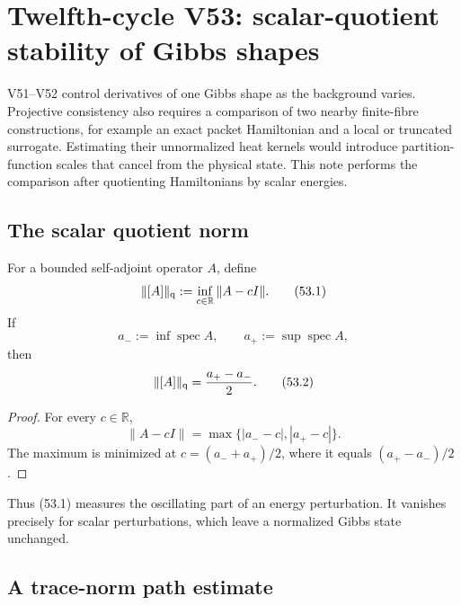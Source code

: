 \documentclass[11pt]{article}
\theoremstyle{remark}
\begin{document}

\section{Twelfth-cycle V53: scalar-quotient stability of Gibbs shapes}
\label{sec:v12v53}

V51--V52 control derivatives of one Gibbs shape as the background
varies.  Projective consistency also requires a comparison of two
nearby finite-fibre constructions, for example an exact packet
Hamiltonian and a local or truncated surrogate.  Estimating their
unnormalized heat kernels would introduce partition-function scales
that cancel from the physical state.  This note performs the
comparison after quotienting Hamiltonians by scalar energies.

\subsection{The scalar quotient norm}

For a bounded self-adjoint operator \(A\), define
\begin{equation}
 \|[A]\|_{\rm q}
 :=
 \inf_{c\in\mathbb R}\|A-cI\|.                    \tag{53.1}
\end{equation}
If
\[
 a_-:=\inf\operatorname{spec}A,\qquad
 a_+:=\sup\operatorname{spec}A,
\]
then
\begin{equation}
 \|[A]\|_{\rm q}={a_+-a_-\over2}.                 \tag{53.2}
\end{equation}

\begin{proof}
For every \(c\in\mathbb R\),
\[
 \|A-cI\|
 =
 \max\{|a_--c|,|a_+-c|\}.
\]
The maximum is minimized at \(c=(a_-+a_+)/2\), where it equals
\((a_+-a_-)/2\).
\end{proof}

Thus (53.1) measures the oscillating part of an energy perturbation.
It vanishes precisely for scalar perturbations, which leave a
normalized Gibbs state unchanged.

\subsection{A trace-norm path estimate}
\end{document}
